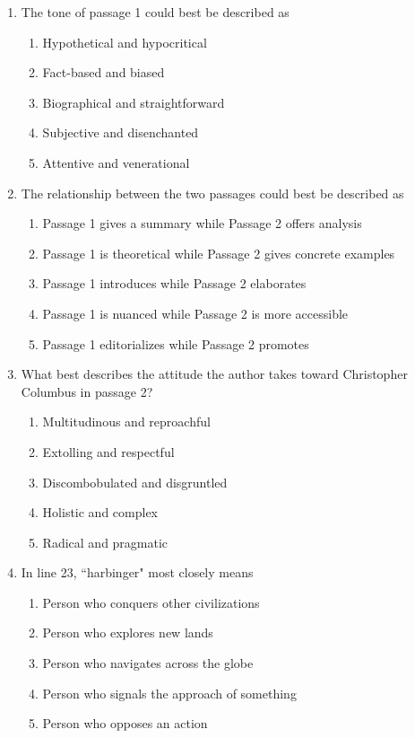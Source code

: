 \documentclass[12pt]{book}
\begin{document}
\newpage
\begin{enumerate}
\item The tone of passage 1 could best be described as
\begin{enumerate}[label=(\Alph*)]
\item Hypothetical and hypocritical
\item Fact-based and biased
\item Biographical and straightforward
\item Subjective and disenchanted
\item Attentive and venerational
\end{enumerate}

\bigskip
\item The relationship between the two passages could best be described as
\begin{enumerate}[label=(\Alph*)]
\item Passage 1 gives a summary while Passage 2 offers analysis
\item Passage 1 is theoretical while Passage 2 gives concrete examples
\item Passage 1 introduces while Passage 2 elaborates
\item Passage 1 is nuanced while Passage 2 is more accessible
\item Passage 1 editorializes while Passage 2 promotes
\end {enumerate}

\bigskip
\item What best describes the attitude the author takes toward Christopher Columbus in passage 2?
\begin{enumerate}[label=(\Alph*)]
\item Multitudinous and reproachful
\item Extolling and respectful
\item Discombobulated and disgruntled
\item Holistic and complex
\item Radical and pragmatic
\end{enumerate}


\bigskip
\item In line 23, ``harbinger" most closely means
\begin{enumerate}[label=(\Alph*)]
\item Person who conquers other civilizations
\item Person who explores new lands
\item Person who navigates across the globe
\item Person who signals the approach of something
\item Person who opposes an action
\end{enumerate}


\end{enumerate}
\end{document}

